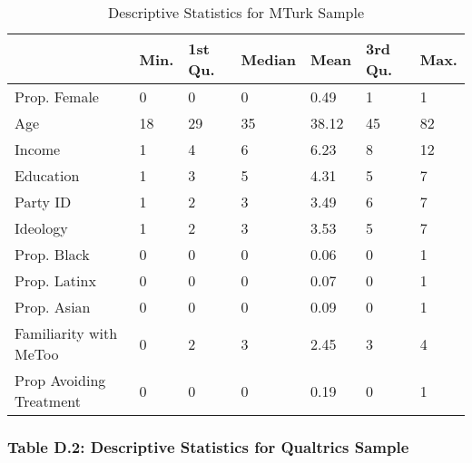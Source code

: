 \documentclass[
]{article}
\begin{document}
\begin{table}[!h]

\caption{\label{tab:tabD1}Descriptive Statistics for MTurk Sample}
\centering
\begin{tabular}[t]{lllllll}
\toprule
  & Min. & 1st Qu. & Median & Mean & 3rd Qu. & Max.\\
\midrule
Prop. Female & 0 & 0 & 0 & 0.49 & 1 & 1\\
Age & 18 & 29 & 35 & 38.12 & 45 & 82\\
Income & 1 & 4 & 6 & 6.23 & 8 & 12\\
Education & 1 & 3 & 5 & 4.31 & 5 & 7\\
Party ID & 1 & 2 & 3 & 3.49 & 6 & 7\\
\addlinespace
Ideology & 1 & 2 & 3 & 3.53 & 5 & 7\\
Prop. Black & 0 & 0 & 0 & 0.06 & 0 & 1\\
Prop. Latinx & 0 & 0 & 0 & 0.07 & 0 & 1\\
Prop. Asian & 0 & 0 & 0 & 0.09 & 0 & 1\\
Familiarity with MeToo & 0 & 2 & 3 & 2.45 & 3 & 4\\
\addlinespace
Prop Avoiding Treatment & 0 & 0 & 0 & 0.19 & 0 & 1\\
\bottomrule
\end{tabular}
\end{table}

\hypertarget{table-d.2-descriptive-statistics-for-qualtrics-sample}{%
\subsubsection{Table D.2: Descriptive Statistics for Qualtrics
Sample}\label{table-d.2-descriptive-statistics-for-qualtrics-sample}}
\end{document}
